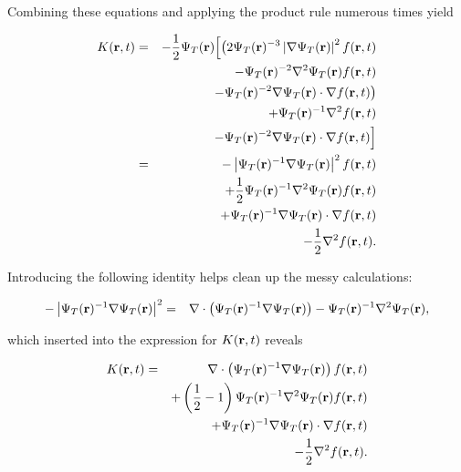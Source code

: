 Combining these equations and applying the product rule numerous times yield

\begin{eqnarray*}
K(\mathbf{r}, t) &=& -\frac{1}{2}\Psi_T(\mathbf{r})\Big[\big(2\Psi_T(\mathbf{r})^{-3}\left|\nabla\Psi_T(\mathbf{r})\right|^2f(\mathbf{r}, t) \\
        & & - \Psi_T(\mathbf{r})^{-2}\nabla^2\Psi_T(\mathbf{r})f(\mathbf{r}, t) \\
        & & - \Psi_T(\mathbf{r})^{-2}\nabla\Psi_T(\mathbf{r})\cdot\nabla f(\mathbf{r}, t)\big) \\
        & & + \Psi_T(\mathbf{r})^{-1}\nabla^2 f(\mathbf{r}, t) \\
        & & - \Psi_T(\mathbf{r})^{-2}\nabla\Psi_T(\mathbf{r})\cdot\nabla f(\mathbf{r}, t)\Big] \\
        &=& - \left|\Psi_T(\mathbf{r})^{-1}\nabla\Psi_T(\mathbf{r})\right|^2f(\mathbf{r}, t) \\
        & & + \frac{1}{2}\Psi_T(\mathbf{r})^{-1}\nabla^2\Psi_T(\mathbf{r})f(\mathbf{r}, t) \\
        & & + \Psi_T(\mathbf{r})^{-1}\nabla\Psi_T(\mathbf{r})\cdot\nabla f(\mathbf{r}, t) \\
        & & - \frac{1}{2}\nabla^2 f(\mathbf{r}, t). \\
\end{eqnarray*}

Introducing the following identity helps clean up the messy calculations:

\begin{eqnarray*}
 -\left|\Psi_T(\mathbf{r})^{-1}\nabla\Psi_T(\mathbf{r})\right|^2 &=& \nabla\cdot\left(\Psi_T(\mathbf{r})^{-1}\nabla\Psi_T(\mathbf{r})\right) - \Psi_T(\mathbf{r})^{-1}\nabla^2\Psi_T(\mathbf{r}),
\end{eqnarray*}

which inserted into the expression for $K(\mathbf{r}, t)$ reveals

\begin{eqnarray*}
K(\mathbf{r}, t) &=&  \nabla\cdot\left(\Psi_T(\mathbf{r})^{-1}\nabla\Psi_T(\mathbf{r})\right)f(\mathbf{r}, t) \\
        & & + \left(\frac{1}{2} - 1\right)\Psi_T(\mathbf{r})^{-1}\nabla^2\Psi_T(\mathbf{r})f(\mathbf{r}, t) \\
        & & + \Psi_T(\mathbf{r})^{-1}\nabla\Psi_T(\mathbf{r})\cdot\nabla f(\mathbf{r}, t) \\
        & & - \frac{1}{2}\nabla^2 f(\mathbf{r}, t). \\
\end{eqnarray*}

